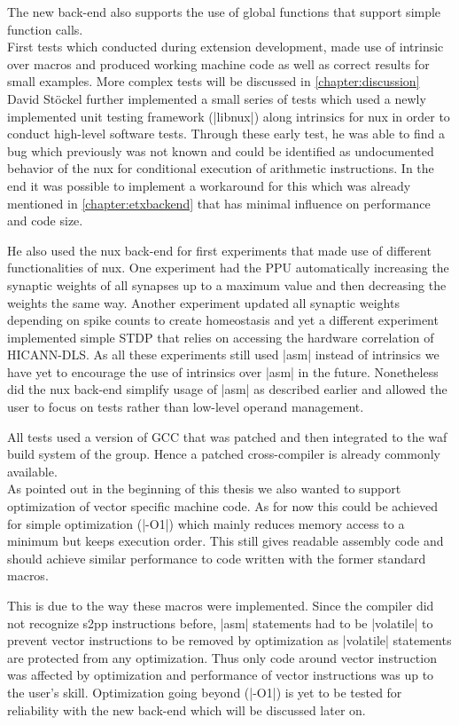 The new back-end also supports the use of global functions that support simple function calls.
\\
First tests which conducted during extension development, made use of intrinsic over macros and produced working machine code as well as correct results for small examples.
More complex tests will be discussed in \ref{chapter:discussion}
David Stöckel further implemented a small series of tests which used a newly implemented unit testing framework (|libnux|) along intrinsics for nux in order to conduct high-level software tests.
Through these early test, he was able to find a bug which previously was not known and could be identified as undocumented behavior of the nux for conditional execution of arithmetic instructions.
In the end it was possible to implement a workaround for this which was already mentioned in \ref{chapter:etxbackend} that has minimal influence on performance and code size.

He also used the nux back-end for first experiments that made use of different functionalities of nux.
One experiment had the PPU automatically increasing the synaptic weights of all synapses up to a maximum value and then decreasing the weights the same way.
Another experiment updated all synaptic weights depending on spike counts to create homeostasis and yet a different experiment implemented simple STDP that relies on accessing the hardware correlation of HICANN-DLS.
As all these experiments still used |asm| instead of intrinsics we have yet to encourage the use of intrinsics over |asm| in the future.
Nonetheless did the nux back-end simplify usage of |asm| as described earlier and allowed the user to focus on tests rather than low-level operand management.

All tests used a version of GCC that was patched and then integrated to the waf build system of the group.
Hence a patched cross-compiler is already commonly available.
\\
As pointed out in the beginning of this thesis we also wanted to support optimization of vector specific machine code.
As for now this could be achieved for simple optimization (|-O1|) which mainly reduces memory access to a minimum but keeps execution order.
This still gives readable assembly code and should achieve similar performance to code written with the former standard macros.

This is due to the way these macros were implemented.
Since the compiler did not recognize s2pp instructions before, |asm| statements had to be |volatile| to prevent vector instructions to be removed by optimization as |volatile| statements are protected from any optimization.
Thus only code around vector instruction was affected by optimization and performance of vector instructions was up to the user's skill.
Optimization going beyond (|-O1|) is yet to be tested for reliability with the new back-end which will be discussed later on.

